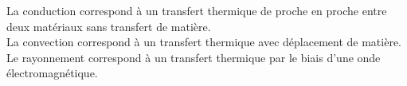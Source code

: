 ﻿\documentclass[a4paper]{article}
\begin{document}
\pagestyle{fancy}
\fancyhf{}
\setlength{\headheight}{15pt}

\begin{center}
	\large{}
\end{center}


La conduction correspond à un transfert thermique de proche en proche entre deux matériaux sans transfert de matière.\\
La convection correspond à un transfert thermique avec déplacement de matière.\\
Le rayonnement correspond à un transfert thermique par le biais d'une onde électromagnétique.
\end{document}
